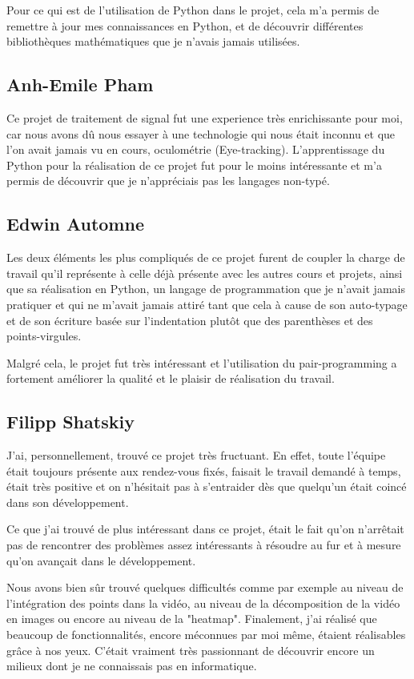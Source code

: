 \documentclass[12pt]{article}
\begin{document}
Pour ce qui est de l'utilisation de Python dans le projet, cela m'a permis de remettre à jour mes connaissances en Python, et de découvrir différentes bibliothèques mathématiques que je n'avais jamais utilisées.

\subsection{Anh-Emile Pham}

Ce projet de traitement de signal fut une experience très enrichissante pour moi, car nous avons dû nous essayer à une technologie qui nous était inconnu et que l'on avait jamais vu en cours, oculométrie (Eye-tracking). 
L'apprentissage du Python pour la réalisation de ce projet fut pour le moins intéressante et m'a permis de découvrir que je n'appréciais pas les langages non-typé.

\subsection{Edwin Automne}

Les deux éléments les plus compliqués de ce projet furent de coupler la charge de travail qu'il représente à celle déjà présente avec les autres cours et projets, ainsi que sa réalisation en Python, un langage de programmation que je n'avait jamais pratiquer et qui ne m'avait jamais attiré tant que cela à cause de son auto-typage et de son écriture basée sur l'indentation plutôt que des parenthèses et des points-virgules.

Malgré cela, le projet fut très intéressant et l'utilisation du pair-programming a fortement améliorer la qualité et le plaisir de réalisation du travail.

\subsection{Filipp Shatskiy}
J'ai, personnellement, trouvé ce projet très fructuant. En effet, toute l'équipe était toujours présente aux rendez-vous fixés, faisait le travail demandé à temps, était très positive et on n'hésitait pas à s'entraider dès que quelqu'un était coincé dans son développement. 

Ce que j'ai trouvé de plus intéressant dans ce projet, était le fait qu'on n'arrêtait pas de rencontrer des problèmes assez intéressants à résoudre au fur et à mesure qu'on avançait dans le développement.

Nous avons bien sûr trouvé quelques difficultés comme par exemple au niveau de l'intégration des points dans la vidéo, au niveau de la décomposition de la vidéo en images ou encore au niveau de la "heatmap".
Finalement, j'ai réalisé que beaucoup de fonctionnalités, encore méconnues par moi même, étaient réalisables grâce à nos yeux. C'était vraiment très passionnant de découvrir encore un milieux dont je ne connaissais pas en informatique.
\end{document}
